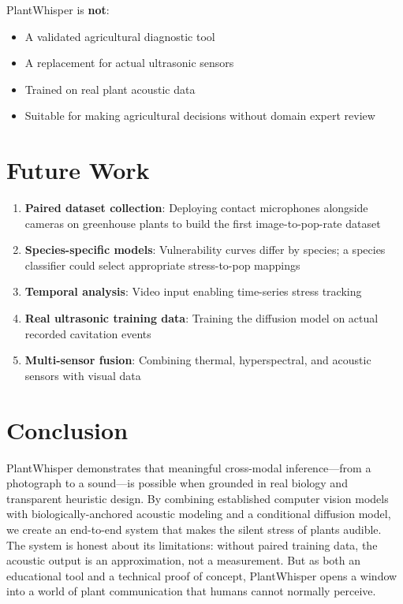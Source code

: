 \documentclass[11pt,a4paper,twocolumn]{article}
\begin{document}
PlantWhisper is \textbf{not}:
\begin{itemize}[nosep]
    \item A validated agricultural diagnostic tool
    \item A replacement for actual ultrasonic sensors
    \item Trained on real plant acoustic data
    \item Suitable for making agricultural decisions without domain expert review
\end{itemize}


\section{Future Work}
\label{sec:future}

\begin{enumerate}[nosep]
    \item \textbf{Paired dataset collection}: Deploying contact microphones alongside cameras on greenhouse plants to build the first image-to-pop-rate dataset
    \item \textbf{Species-specific models}: Vulnerability curves differ by species; a species classifier could select appropriate stress-to-pop mappings
    \item \textbf{Temporal analysis}: Video input enabling time-series stress tracking
    \item \textbf{Real ultrasonic training data}: Training the diffusion model on actual recorded cavitation events
    \item \textbf{Multi-sensor fusion}: Combining thermal, hyperspectral, and acoustic sensors with visual data
\end{enumerate}


\section{Conclusion}

PlantWhisper demonstrates that meaningful cross-modal inference---from a photograph to a sound---is possible when grounded in real biology and transparent heuristic design. By combining established computer vision models with biologically-anchored acoustic modeling and a conditional diffusion model, we create an end-to-end system that makes the silent stress of plants audible. The system is honest about its limitations: without paired training data, the acoustic output is an approximation, not a measurement. But as both an educational tool and a technical proof of concept, PlantWhisper opens a window into a world of plant communication that humans cannot normally perceive.
\end{document}

